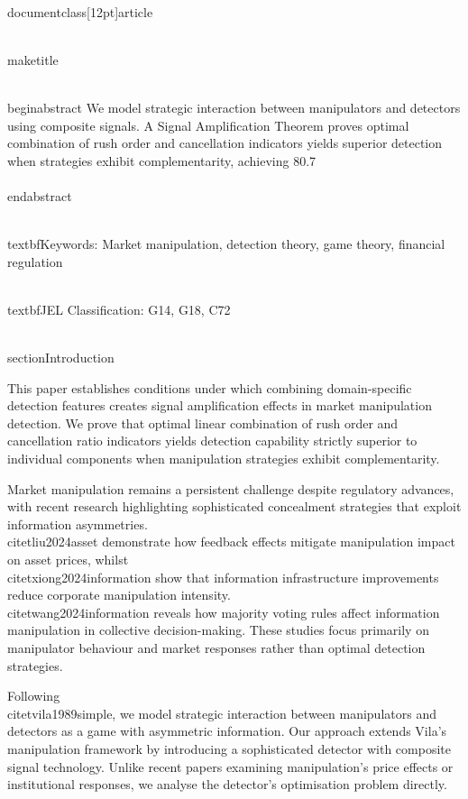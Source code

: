 \\documentclass[12pt]{article}
\begin{document}
\\maketitle

\\begin{abstract}
We model strategic interaction between manipulators and detectors using composite signals. A Signal Amplification Theorem proves optimal combination of rush order and cancellation indicators yields superior detection when strategies exhibit complementarity, achieving 80.7\\%
\\end{abstract}

\\textbf{Keywords:} Market manipulation, detection theory, game theory, financial regulation

\\textbf{JEL Classification:} G14, G18, C72

\\section{Introduction}

This paper establishes conditions under which combining domain-specific detection features creates signal amplification effects in market manipulation detection. We prove that optimal linear combination of rush order and cancellation ratio indicators yields detection capability strictly superior to individual components when manipulation strategies exhibit complementarity.

Market manipulation remains a persistent challenge despite regulatory advances, with recent research highlighting sophisticated concealment strategies that exploit information asymmetries. \\citet{liu2024asset} demonstrate how feedback effects mitigate manipulation impact on asset prices, whilst \\citet{xiong2024information} show that information infrastructure improvements reduce corporate manipulation intensity. \\citet{wang2024information} reveals how majority voting rules affect information manipulation in collective decision-making. These studies focus primarily on manipulator behaviour and market responses rather than optimal detection strategies.

Following \\citet{vila1989simple}, we model strategic interaction between manipulators and detectors as a game with asymmetric information. Our approach extends Vila's manipulation framework by introducing a sophisticated detector with composite signal technology. Unlike recent papers examining manipulation's price effects or institutional responses, we analyse the detector's optimisation problem directly.
\end{document}

